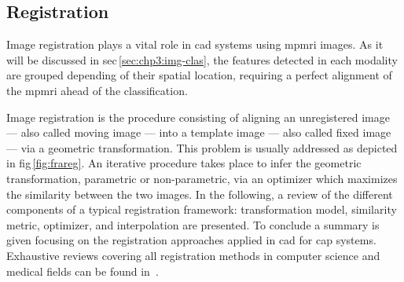 \subsection{Registration}\label{subsec:chp3:img-reg:reg}


Image registration plays a vital role in \ac{cad} systems using \ac{mpmri}
images.
As it will be discussed in \acs{sec}\,\ref{sec:chp3:img-clas}, the features
detected in each modality are grouped depending of their spatial location,
requiring a perfect alignment of the \ac{mpmri} ahead of the classification.

Image registration is the procedure consisting of aligning an unregistered
image --- also called moving image --- into a template image --- also called
fixed image --- via a geometric transformation.
This problem is usually addressed as depicted in \ac{fig}\,\ref{fig:frareg}.
An iterative procedure takes place to infer the geometric transformation,
parametric or non-parametric, via an optimizer which maximizes the similarity
between the two images.
In the following, a review of the different components of a typical
registration framework: transformation model, similarity metric, optimizer, and
interpolation are presented.
To conclude a summary is given focusing on the registration approaches applied in \ac{cad} for \ac{cap} systems.
Exhaustive reviews covering all registration methods in computer science and
medical fields can be found in~\cite{Maintz1998,Zitova2003}.

